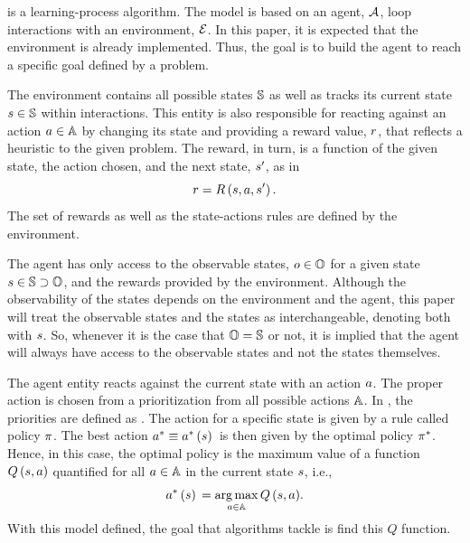 \documentclass[conference]{IEEEtran}
\begin{document}
{\QLearning} is a learning-process algorithm.
The model is based on an agent, $\mathcal{A}$, loop interactions with an environment, $\mathcal{E}$.
In this paper, it is expected that the environment is already implemented.
Thus, the goal is to build the agent to reach a specific goal defined by a problem.

The environment contains all possible states $\mathbb{S}$ as well as tracks its current state $s \in \mathbb{S}$ within interactions.
This entity is also responsible for reacting against an action $a \in \mathbb{A}$ by changing its state and providing a reward value, $r$, that reflects a heuristic to the given problem.
The reward, in turn, is a function of the given state, the action chosen, and the next state, $s^{\prime}$, as in
\begin{equation}
    \reward = \rewardf.
    \label{reward function}
\end{equation}
The set of rewards as well as the state-actions rules are defined by the environment.

The agent has only access to the observable states, $o \in \mathbb{O}$ for a given state $s \in \mathbb{S} \supset \mathbb{O}$, and the rewards provided by the environment.
Although the observability of the states depends on the environment and the agent, this paper will treat the observable states and the states as interchangeable, denoting both with $s$.
So, whenever it is the case that $\mathbb{O} = \mathbb{S}$ or not, it is implied that the agent will always have access to the observable states and not the states themselves.

The agent entity reacts against the current state with an action $a$.
The proper action is chosen from a prioritization from all possible actions $\mathbb{A}$.
In {\Qlearning}, the priorities are defined as {\Qvalues}.
The action for a specific state is given by a rule called policy $\pi$.
The best action $\bestaction \equiv \bestactionf$ is then given by the optimal policy $\pi^{*}$.
Hence, in this case, the optimal policy is the maximum value of a function $\Qf$ quantified for all $a \in \mathbb{A}$ in the current state $s$, i.e.,
\begin{equation}
    \bestactionf = \argmax_{\action \in \actions}{\Qf}.
    \label{best action}
\end{equation}
With this model defined, the goal that {\Qlearning} algorithms tackle is find this $Q$ function.

\end{document}
